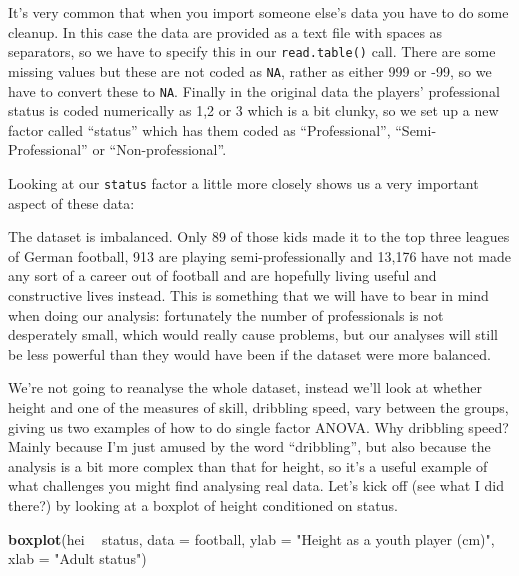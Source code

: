 \documentclass[
]{book}
\newenvironment{Shaded}{\begin{snugshade}}{\end{snugshade}}
\newcommand{\DataTypeTok}[1]{\textcolor[rgb]{0.13,0.29,0.53}{#1}}
\newcommand{\DecValTok}[1]{\textcolor[rgb]{0.00,0.00,0.81}{#1}}
\newcommand{\KeywordTok}[1]{\textcolor[rgb]{0.13,0.29,0.53}{\textbf{#1}}}
\newcommand{\NormalTok}[1]{#1}
\newcommand{\OperatorTok}[1]{\textcolor[rgb]{0.81,0.36,0.00}{\textbf{#1}}}
\newcommand{\StringTok}[1]{\textcolor[rgb]{0.31,0.60,0.02}{#1}}
\begin{document}
It's very common that when you import someone else's data you have to do some cleanup. In this case the data are provided as a text file with spaces as separators, so we have to specify this in our \texttt{read.table()} call. There are some missing values but these are not coded as \texttt{NA}, rather as either 999 or -99, so we have to convert these to \texttt{NA}. Finally in the original data the players' professional status is coded numerically as 1,2 or 3 which is a bit clunky, so we set up a new factor called ``status'' which has them coded as ``Professional'', ``Semi-Professional'' or ``Non-professional''.

Looking at our \texttt{status} factor a little more closely shows us a very important aspect of these data:

\begin{Shaded}
\end{Shaded}

The dataset is imbalanced. Only 89 of those kids made it to the top three leagues of German football, 913 are playing semi-professionally and 13,176 have not made any sort of a career out of football and are hopefully living useful and constructive lives instead. This is something that we will have to bear in mind when doing our analysis: fortunately the number of professionals is not desperately small, which would really cause problems, but our analyses will still be less powerful than they would have been if the dataset were more balanced.

We're not going to reanalyse the whole dataset, instead we'll look at whether height and one of the measures of skill, dribbling speed, vary between the groups, giving us two examples of how to do single factor ANOVA. Why dribbling speed? Mainly because I'm just amused by the word ``dribbling'', but also because the analysis is a bit more complex than that for height, so it's a useful example of what challenges you might find analysing real data. Let's kick off (see what I did there?) by looking at a boxplot of height conditioned on status.

\begin{Shaded}
\begin{Highlighting}[]

\KeywordTok{boxplot}\NormalTok{(hei }\OperatorTok{~}\StringTok{ }\NormalTok{status, }
        \DataTypeTok{data =}\NormalTok{ football,}
        \DataTypeTok{ylab =} \StringTok{"Height as a youth player (cm)"}\NormalTok{,}
        \DataTypeTok{xlab =} \StringTok{"Adult status"}\NormalTok{)}
\end{Highlighting}
\end{Shaded}
\end{document}
